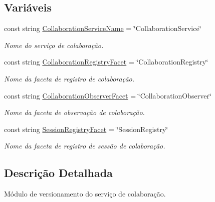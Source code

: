 \subsection*{\-Variáveis}
\begin{DoxyCompactItemize}
\item 
\hypertarget{namespacetecgraf_1_1openbus_1_1services_1_1collaboration_1_1v1__0_afaeb4633ec60b3ed35e50aa34ab7ffcd}{const string \hyperlink{namespacetecgraf_1_1openbus_1_1services_1_1collaboration_1_1v1__0_afaeb4633ec60b3ed35e50aa34ab7ffcd}{\-Collaboration\-Service\-Name} = \char`\"{}\-Collaboration\-Service\char`\"{}}\label{namespacetecgraf_1_1openbus_1_1services_1_1collaboration_1_1v1__0_afaeb4633ec60b3ed35e50aa34ab7ffcd}

\begin{DoxyCompactList}\small\item\em \-Nome do serviço de colaboração. \end{DoxyCompactList}\item 
\hypertarget{namespacetecgraf_1_1openbus_1_1services_1_1collaboration_1_1v1__0_a619e5833412a88a89b52d041bcaa0617}{const string \hyperlink{namespacetecgraf_1_1openbus_1_1services_1_1collaboration_1_1v1__0_a619e5833412a88a89b52d041bcaa0617}{\-Collaboration\-Registry\-Facet} = \char`\"{}\-Collaboration\-Registry\char`\"{}}\label{namespacetecgraf_1_1openbus_1_1services_1_1collaboration_1_1v1__0_a619e5833412a88a89b52d041bcaa0617}

\begin{DoxyCompactList}\small\item\em \-Nome da faceta de registro de colaboração. \end{DoxyCompactList}\item 
\hypertarget{namespacetecgraf_1_1openbus_1_1services_1_1collaboration_1_1v1__0_ae12827c26d85d3632c575524720f898a}{const string \hyperlink{namespacetecgraf_1_1openbus_1_1services_1_1collaboration_1_1v1__0_ae12827c26d85d3632c575524720f898a}{\-Collaboration\-Observer\-Facet} = \char`\"{}\-Collaboration\-Observer\char`\"{}}\label{namespacetecgraf_1_1openbus_1_1services_1_1collaboration_1_1v1__0_ae12827c26d85d3632c575524720f898a}

\begin{DoxyCompactList}\small\item\em \-Nome da faceta de observação de colaboração. \end{DoxyCompactList}\item 
\hypertarget{namespacetecgraf_1_1openbus_1_1services_1_1collaboration_1_1v1__0_a8dac222a1db69f24c8d7f92596a8af58}{const string \hyperlink{namespacetecgraf_1_1openbus_1_1services_1_1collaboration_1_1v1__0_a8dac222a1db69f24c8d7f92596a8af58}{\-Session\-Registry\-Facet} = \char`\"{}\-Session\-Registry\char`\"{}}\label{namespacetecgraf_1_1openbus_1_1services_1_1collaboration_1_1v1__0_a8dac222a1db69f24c8d7f92596a8af58}

\begin{DoxyCompactList}\small\item\em \-Nome da faceta de registro de sessão de colaboração. \end{DoxyCompactList}\end{DoxyCompactItemize}


\subsection{\-Descrição \-Detalhada}
\-Módulo de versionamento do serviço de colaboração. 